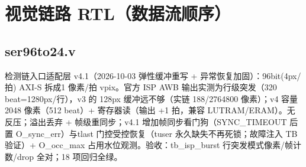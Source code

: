 \documentclass[10pt]{ctexart}
\newcommand{\fileintro}[1]{{\small\color{accent}#1}\par\vspace{2pt}}
\begin{document}
\section{视觉链路 RTL（数据流顺序）}
\subsection{ser96to24.v}
\fileintro{检测链入口适配层 v4.1（2026-10-03 弹性缓冲重写 + 异常恢复加固）：96bit(4px/拍) AXI-S 拆成1 像素/拍 vpix。官方 ISP AWB 输出实测为行级突发（320 beat=1280px/行），v3 的 128px 缓冲远不够（实链 188/2764800 像素）；v4 容量 2048 像素（512 beat）+ 寄存器读（输出 +1 拍，兼容 LUTRAM/ERAM）。无反压；溢出丢弃 + 帧级重同步；v4.1 增加帧同步看门狗（SYNC\_TIMEOUT 后置 O\_sync\_err）与tlast 门控受控恢复（tuser 永久缺失不再死锁；故障注入 TB 验证）+ O\_occ\_max 占用水位观测。验收：tb\_isp\_burst 行突发模式像素/帧计数/drop 全对；18 项回归全绿。}
\end{document}
